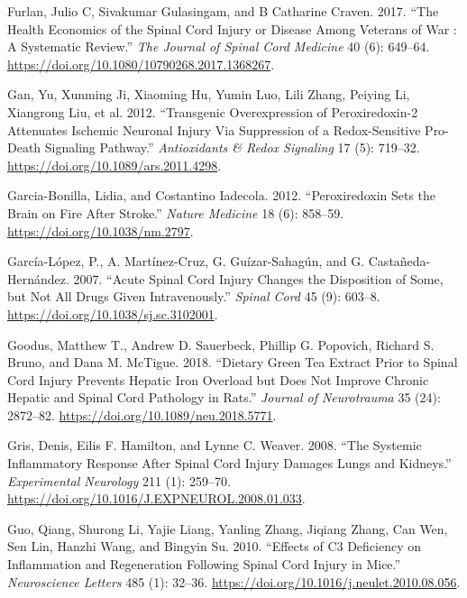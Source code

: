 \documentclass[
]{article}
\newlength{\cslhangindent}
\newlength{\cslentryspacingunit} %
\newenvironment{CSLReferences}[2] %
 {%
  \setlength{\parindent}{0pt}
  \ifodd #1
  \let\oldpar\par
  \def\par{\hangindent=\cslhangindent\oldpar}
  \fi
  \setlength{\parskip}{#2\cslentryspacingunit}
 }%
 {}
\begin{document}
\begin{landscape}
\begin{landscape}
\begin{CSLReferences}{1}{0}
\leavevmode{}%
Furlan, Julio C, Sivakumar Gulasingam, and B Catharine Craven. 2017. {``The {Health Economics} of the Spinal Cord Injury or Disease Among Veterans of War : {A} Systematic Review.''} \emph{The Journal of Spinal Cord Medicine} 40 (6): 649--64. \url{https://doi.org/10.1080/10790268.2017.1368267}.

\leavevmode{}%
Gan, Yu, Xunming Ji, Xiaoming Hu, Yumin Luo, Lili Zhang, Peiying Li, Xiangrong Liu, et al. 2012. {``Transgenic {Overexpression} of {Peroxiredoxin-2 Attenuates Ischemic Neuronal Injury Via Suppression} of a {Redox-Sensitive Pro-Death Signaling Pathway}.''} \emph{Antioxidants \& Redox Signaling} 17 (5): 719--32. \url{https://doi.org/10.1089/ars.2011.4298}.

\leavevmode{}%
Garcia-Bonilla, Lidia, and Costantino Iadecola. 2012. {``Peroxiredoxin Sets the Brain on Fire After Stroke.''} \emph{Nature Medicine} 18 (6): 858--59. \url{https://doi.org/10.1038/nm.2797}.

\leavevmode{}%
García-López, P., A. Martínez-Cruz, G. Guízar-Sahagún, and G. Castañeda-Hernández. 2007. {``Acute Spinal Cord Injury Changes the Disposition of Some, but Not All Drugs Given Intravenously.''} \emph{Spinal Cord} 45 (9): 603--8. \url{https://doi.org/10.1038/sj.sc.3102001}.

\leavevmode{}%
Goodus, Matthew T., Andrew D. Sauerbeck, Phillip G. Popovich, Richard S. Bruno, and Dana M. McTigue. 2018. {``Dietary Green Tea Extract Prior to Spinal Cord Injury Prevents Hepatic Iron Overload but Does Not Improve Chronic Hepatic and Spinal Cord Pathology in Rats.''} \emph{Journal of Neurotrauma} 35 (24): 2872--82. \url{https://doi.org/10.1089/neu.2018.5771}.

\leavevmode{}%
Gris, Denis, Eilis F. Hamilton, and Lynne C. Weaver. 2008. {``The Systemic Inflammatory Response After Spinal Cord Injury Damages Lungs and Kidneys.''} \emph{Experimental Neurology} 211 (1): 259--70. \url{https://doi.org/10.1016/J.EXPNEUROL.2008.01.033}.

\leavevmode{}%
Guo, Qiang, Shurong Li, Yajie Liang, Yanling Zhang, Jiqiang Zhang, Can Wen, Sen Lin, Hanzhi Wang, and Bingyin Su. 2010. {``Effects of {C3} Deficiency on Inflammation and Regeneration Following Spinal Cord Injury in Mice.''} \emph{Neuroscience Letters} 485 (1): 32--36. \url{https://doi.org/10.1016/j.neulet.2010.08.056}.


\end{CSLReferences}
\end{landscape}
\end{landscape}
\end{document}
